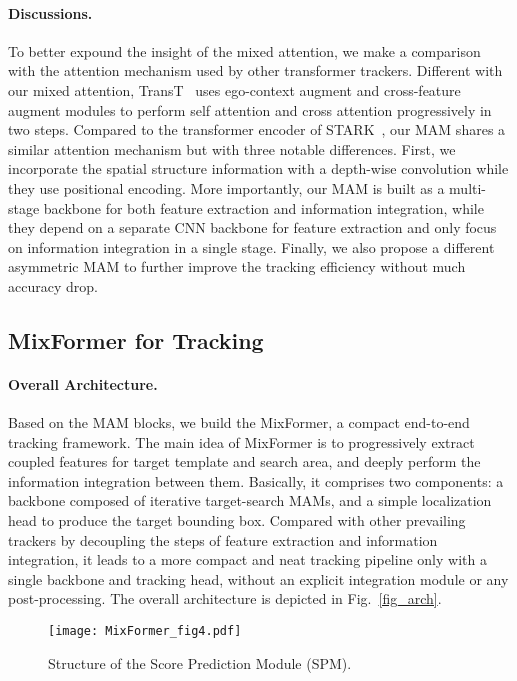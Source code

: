 \paragraph{Discussions.}
To better expound the insight of the mixed attention, we make a comparison with the attention mechanism used by other transformer trackers.
Different with our mixed attention, TransT~\cite{tt} uses ego-context augment and cross-feature augment modules to perform self attention and cross attention progressively in two steps. Compared to the transformer encoder of STARK~\cite{stark}, our MAM shares a similar attention mechanism but with three notable differences. First, we incorporate the spatial structure information with a depth-wise convolution while they use positional encoding. More importantly, our MAM is built as a multi-stage backbone for both feature extraction and information integration, while they depend on a separate CNN backbone for feature extraction and only focus on information integration in a single stage. Finally, we also propose a different asymmetric MAM to further improve the tracking efficiency without much accuracy drop.

\subsection{MixFormer for Tracking}

\paragraph{Overall Architecture.}
Based on the MAM blocks, we build the MixFormer, a compact end-to-end tracking framework. The main idea of MixFormer is to progressively extract coupled features for target template and search area, and deeply perform the information integration between them. Basically, it comprises two components: a backbone composed of iterative target-search MAMs, and a simple localization head to produce the target bounding box.
Compared with other prevailing trackers by decoupling the steps of feature extraction and information integration, it leads to a more compact and neat tracking pipeline only with a single backbone and tracking head, without an explicit integration module or any post-processing. 
The overall architecture is depicted in Fig.~\ref{fig_arch}. 

\begin{figure}[t]
\centering
\texttt{[image: MixFormer\_fig4.pdf]}
\vspace{-6mm}
\caption{Structure of the Score Prediction Module (SPM). 
}
\vspace{-5mm}
\label{fig_score_module}
\end{figure}
